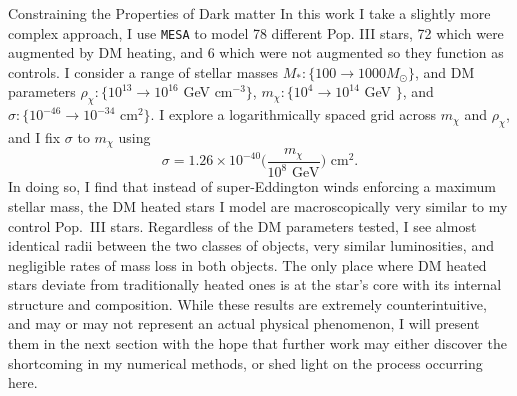 \documentclass[a4paper,11pt]{article}
\begin{document}
\begin{section}{Constraining the Properties of Dark matter}
    In this work I take a slightly more complex approach, I use \texttt{MESA} to model 78 different Pop. III stars, 72 which were augmented by DM heating, and 6 which were not augmented so they function as controls.
    I consider a range of stellar masses $M_*: \{100 \to 1000 M_\odot \}$, and DM parameters $\rho_\chi: \{10^{13} \to 10^{16}$ GeV cm$^{-3}\}$, $m_\chi: \{10^4 \to 10^{14}$ GeV $\}$, and $\sigma: \{10^{-46} \to 10^{-34}$ cm$^2\}$. 
    I explore a logarithmically spaced grid across $m_\chi$ and $\rho_\chi$, and I fix $\sigma$ to $m_\chi$ using
    \begin{equation}
        \sigma  = 1.26 \times 10^{-40} \bigg(\frac{m_\chi}{10^8 \text{ GeV}}\bigg) \text{ cm}^2.
    \end{equation}
    In doing so, I find that instead of super-Eddington winds enforcing a maximum stellar mass, the DM heated stars I model are macroscopically very similar to my control Pop.~III stars.
    Regardless of the DM parameters tested, I see almost identical radii between the two classes of objects, very similar luminosities, and negligible rates of mass loss in both objects. 
    The only place where DM heated stars deviate from traditionally heated ones is at the star's core with its internal structure and composition.
    While these results are extremely counterintuitive, and may or may not represent an actual physical phenomenon, I will present them in the next section with the hope that further work may either discover the shortcoming in my numerical methods, or shed light on the process occurring here.
\end{section}
\end{document}

